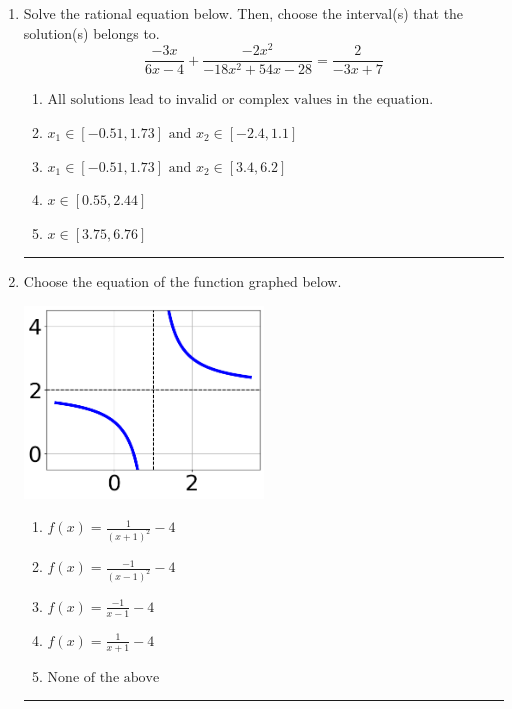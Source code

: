 \documentclass[14pt]{extbook}
\newcommand{\litem}[1]{\item#1\hspace*{-1cm}\rule{\textwidth}{0.4pt}}
\begin{document}
\begin{enumerate}
{\begin{enumerate}[label=\Alph*.]
\end{enumerate} }
\litem{
Solve the rational equation below. Then, choose the interval(s) that the solution(s) belongs to.\[ \frac{-3x}{6x -4} + \frac{-2x^{2}}{-18x^{2} +54 x -28} = \frac{2}{-3x + 7} \]\begin{enumerate}[label=\Alph*.]
\item \( \text{All solutions lead to invalid or complex values in the equation.} \)
\item \( x_1 \in [-0.51, 1.73] \text{ and } x_2 \in [-2.4,1.1] \)
\item \( x_1 \in [-0.51, 1.73] \text{ and } x_2 \in [3.4,6.2] \)
\item \( x \in [0.55,2.44] \)
\item \( x \in [3.75,6.76] \)

\end{enumerate} }
\litem{
Choose the equation of the function graphed below.
\begin{center}
    \includegraphics[width=0.5\textwidth]{../Figures/rationalGraphToEquationB.png}
\end{center}
\begin{enumerate}[label=\Alph*.]
\item \( f(x) = \frac{1}{(x + 1)^2} - 4 \)
\item \( f(x) = \frac{-1}{(x - 1)^2} - 4 \)
\item \( f(x) = \frac{-1}{x - 1} - 4 \)
\item \( f(x) = \frac{1}{x + 1} - 4 \)
\item \( \text{None of the above} \)


\end{enumerate}}
\end{enumerate}
\end{document}
